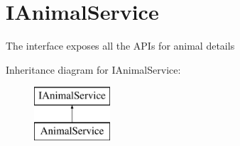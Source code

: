 \hypertarget{interfaceWildLifeTracker_1_1Services_1_1IAnimalService}{}\section{I\+Animal\+Service}
\label{interfaceWildLifeTracker_1_1Services_1_1IAnimalService}


The interface exposes all the A\+P\+Is for animal details  


Inheritance diagram for I\+Animal\+Service\+:\begin{figure}[H]
\begin{center}
\leavevmode
\includegraphics[height=2.000000cm]{interfaceWildLifeTracker_1_1Services_1_1IAnimalService}
\end{center}
\end{figure}

